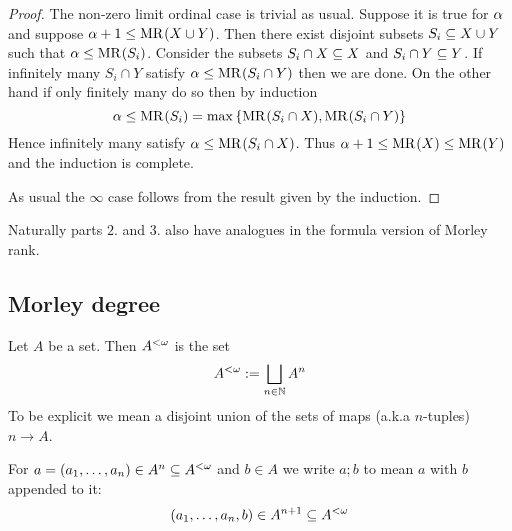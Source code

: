 \begin{proof}
    The non-zero limit ordinal case is trivial as usual.
    Suppose it is true for $\alpha$ and suppose $\alpha + 1 \leq \mathrm{MR}^{}(X \cup Y)$.
    Then there exist disjoint subsets $S_i \subseteq X \cup Y$ such that 
    $\alpha \leq \mathrm{MR}^{}(S_i)$.
    Consider the subsets $S_i \cap X \subseteq X$ and $S_i \cap Y \subseteq Y$.
    If infinitely many $S_i \cap Y$ satisfy $\alpha \leq \mathrm{MR}^{}(S_i \cap Y)$
    then we are done.
    On the other hand if only finitely many do so then by induction
    \[\alpha \leq \mathrm{MR}^{}(S_i) = \max \left\{\mathrm{MR}^{}(S_i \cap X), \mathrm{MR}^{}(S_i \cap Y)\right\}\]
    Hence infinitely many satisfy $\alpha \leq \mathrm{MR}^{}(S_i \cap X)$.
    Thus $\alpha + 1 \leq \mathrm{MR}^{}(X) \leq \mathrm{MR}^{}(Y)$ and the induction is complete.
    
    As usual the $\infty$ case follows from the result given by the induction.
\end{proof}
Naturally parts $2.$ and $3.$ also have analogues in the formula version of 
Morley rank.

\subsection{Morley degree}
\begin{nttn}
    Let $A$ be a set.
    Then $A^{<\omega}$ is the set 
    \[A^{<\omega} := \bigsqcup_{n \in \mathbb{N}} A^n\]
    To be explicit we mean a disjoint union of the sets of maps 
    (a.k.a $n$-tuples) $n \to A$.

    For $a = (a_1,\dots,a_n) \in A^n \subseteq A^{<\omega}$ 
    and $b \in A$ we write $a;b$ to mean
    $a$ with $b$ appended to it: 
    \[(a_1,\dots,a_n,b) \in A^{n+1} \subseteq A^{<\omega}\]
\end{nttn}

